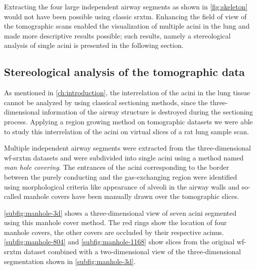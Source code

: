 Extracting the four large independent airway segments as shown in \autoref{fig:skeleton} would not have been possible using classic \ac{srxtm}. Enhancing the field of view of the tomographic scans enabled the visualization of multiple acini in the lung and made more descriptive results possible; such results, namely a stereological analysis of single acini is presented in the following section.

\subsection{Stereological analysis of the tomographic data\label{subsec:stereological analysis}}
As mentioned in \autoref{ch:introduction}, the interrelation of the acini in the lung tissue cannot be analyzed by using classical sectioning methods, since the three-dimensional information of the airway structure is destroyed during the sectioning process. Applying a region growing method on tomographic datasets we were able to study this interrelation of the acini on virtual slices of a rat lung sample scan.

Multiple independent airway segments were extracted from the three-dimensional \ac{wf-srxtm} datasets and were subdivided into single acini using a method named \emph{man hole covering}. The entrances of the acini corresponding to the border between the purely conducting and the gas-exchanging region were identified using morphological criteria like appearance of alveoli in the airway walls and so-called manhole covers have been manually drawn over the tomographic slices. 

\autoref{subfig:manhole-3d} shows a three-dimensional view of seven acini seg\-ment\-ed using this manhole cover method. The red rings show the location of four manhole covers, the other covers are occluded by their respective acinus. \autoref{subfig:manhole-804} and \ref{subfig:manhole-1168} show slices from the original \ac{wf-srxtm} dataset combined with a two-dimensional view of the three-dimensional segmentation shown in \autoref{subfig:manhole-3d}.

